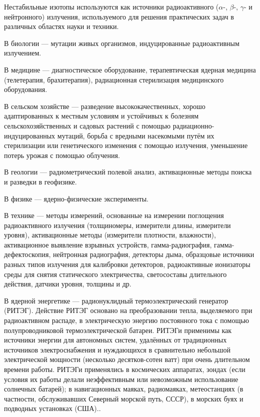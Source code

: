 \documentclass[a5paper,openany]{book}
\begin{document}
Нестабильные изотопы используются как источники радиоактивного ($\alpha$-, $\beta$-, $\gamma$- и нейтронного) излучения, используемого для решения практических задач в различных областях науки и техники.

В биологии --- мутации живых организмов, индуцированные радиоактивным излучением.

В медицине --- диагностическое оборудование, терапевтическая ядерная медицина (телетерапия, брахитерапия), радиационная стерилизация медицинского оборудования.

В сельском хозяйстве --- разведение высококачественных, хорошо адаптированных к местным условиям и устойчивых к болезням сельскохозяйственных и садовых растений с помощью радиационно-индуцированных мутаций, борьба с вредными насекомыми путём их стерилизации или генетического изменения с помощью излучения, уменьшение потерь урожая с помощью облучения.

В геологии --- радиометрический полевой анализ, активационные методы поиска и разведки в геофизике.

В физике --- ядерно-физические эксперименты.

В технике --- методы измерений, основанные на измерении поглощения радиоактивного излучения (толщиномеры, измерители длины, измерители уровня), активационные методы (измерители плотности, влажности), активационное выявление взрывных устройств, гамма-радиография, гамма-дефектоскопия, нейтронная радиография, детекторы дыма, образцовые источники разных типов излучения для калибровки детекторов, радиоактивные ионизаторы среды для снятия статического электричества, светосоставы длительного действия, датчики уровня, толщины и др.

В ядерной энергетике --- радионуклидный термоэлектрический генератор (РИТЭГ). Действие РИТЭГ основано на преобразовании тепла, выделяемого при радиоактивном распаде, в электрическую энергию постоянного тока с помощью полупроводниковой термоэлектрической батареи. РИТЭГи применимы как источники энергии для автономных систем, удалённых от традиционных источников электроснабжения и нуждающихся в сравнительно небольшой электрической мощности (несколько десятков-сотен ватт) при очень длительном времени работы. РИТЭГи применялись в космических аппаратах, зондах (если условия их работы делали  неэффективным или невозможным использование солнечных батарей);  в навигационных маяках, радиомаяках, метеостанциях (в частности, обслуживавших Северный морской путь, СССР), в морских буях и подводных установках (США)..
\end{document}
